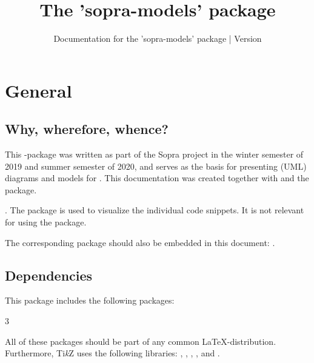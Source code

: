 \documentclass{sopra-base}
\title{The 'sopra-models' package}
\subtitle[Documentation for the 'sopra-models' package]{Documentation for the 'sopra-models' package | Version \thesomversion}
\begin{document}
    \maketitle

\section{General}
\subsection{Why, wherefore, whence?}
    This \LaTeXe-package was written as part of the Sopra project in the
    winter semester of 2019 and summer semester of 2020, and serves as the
    basis for presenting (UML) diagrams and models
    for . This documentation was created together with
     and the  package.\par
    .\newline
    The  package is used to visualize the
    individual code snippets. It is not relevant for using the package.\par
    The corresponding package should also be embedded in this document: .
\subsection{Dependencies}
    This package includes the following packages:
    \begin{multicols}{3}
    \end{multicols}
    All of these packages should be part of any common \LaTeX-distribution. Furthermore, Ti\textit{k}Z uses the following
    libraries: , , , ,  and .
\end{document}
